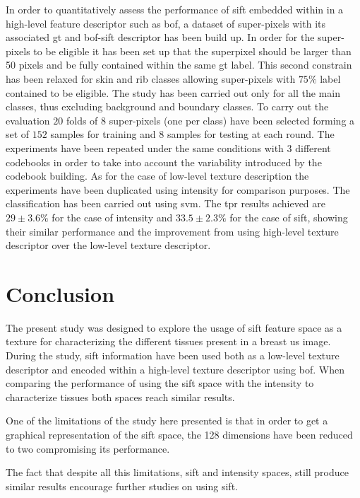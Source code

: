 \documentclass[a4paper, 10pt, conference]{llncs}      %
\begin{document}
In order to quantitatively assess the performance of \ac{sift} embedded within in a high-level feature descriptor such as \ac{bof}, a dataset of super-pixels with its associated \ac{gt} and \ac{bof}-\ac{sift} descriptor has been build up. In order for the super-pixels to be eligible it has been set up that the superpixel should be larger than 50 pixels and be fully contained within the same \ac{gt} label. This second constrain has been relaxed for skin and rib classes allowing super-pixels with $75\%$ label contained to be eligible. The study has been carried out only for all the main classes, thus excluding background and boundary classes. To carry out the evaluation $20$ folds of $8$ super-pixels (one per class) have been selected forming a set of $152$ samples for training and $8$ samples for testing at each round. The experiments have been repeated under the same conditions with $3$ different codebooks in order to take into account the variability introduced by the codebook building. As for the case of low-level texture description the experiments have been duplicated using intensity for comparison purposes. The classification has been carried out using \ac{svm}. The \ac{tpr} results achieved are $29\pm3.6\%$ for the case of intensity and $33.5\pm2.3\%$ for the case of \ac{sift}, showing their similar performance and the improvement from using high-level texture descriptor over the low-level texture descriptor.

\vspace{-10pt}

\section{Conclusion} 
\vspace{-3pt}
The present study was designed to explore the usage of \ac{sift} feature space as a texture for characterizing the different tissues present in a breast \ac{us} image. During the study, \ac{sift} information have been used both as a low-level texture descriptor and encoded within a high-level texture descriptor using \ac{bof}. When comparing the performance of using the \ac{sift} space with the intensity to characterize tissues both spaces reach similar results. 

One of the limitations of the study here presented is that in order to get a graphical representation of the \ac{sift} space, the 128 dimensions have been reduced to two compromising its performance. 

The fact that despite all this limitations, \ac{sift} and intensity spaces, still produce similar results encourage further studies on using \ac{sift}.

\vspace{-5pt}
%


\end{document}

